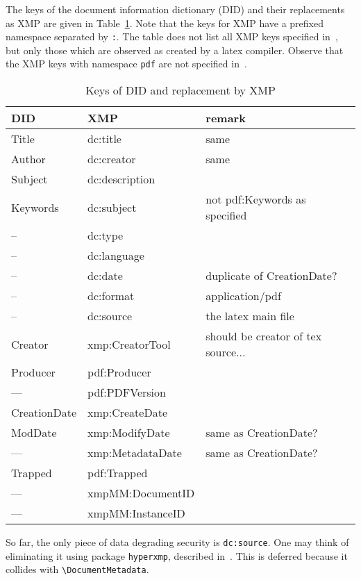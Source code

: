 \documentclass[a4paper, english]{article}%
\newcommand{\cmd}[1]{\texttt{\textbackslash#1}}
\begin{document}
The keys of the document information dictionary (DID) 
and their replacements as XMP are given in Table~\ref{tab:keysDID_XMP}. 
Note that the keys for XMP have a prefixed namespace separated by \texttt{:}. 
The table does not list all XMP keys specified in~\cite{ISO16684-1}, 
but only those which are observed as created by a latex compiler. 
Observe that the XMP keys with namespace \texttt{pdf} are not specified in~\cite{ISO16684-1}. 


\begin{longtable}{|lll|}
  \toprule
  DID & XMP & remark \\
  \midrule
  \midrule
  \endfirsthead%
  \bottomrule
  \caption{\label{tab:keysDID_XMP} Keys of DID and replacement by XMP}
  \endlastfoot%
  Title        & dc:title   & same\\
  Author       & dc:creator & same \\
  Subject      & dc:description & \\
  Keywords     & dc:subject & not pdf:Keywords as specified \\
  --           & dc:type & \\
  --           & dc:language & \\
  --           & dc:date & duplicate of CreationDate? \\
  --           & dc:format & application/pdf \\
  --           & dc:source & the latex main file \\
  Creator      & xmp:CreatorTool & should be creator of tex source... \\
  Producer     & pdf:Producer & \\
  ---          & pdf:PDFVersion & \\
  CreationDate & xmp:CreateDate & \\
  ModDate      & xmp:ModifyDate & same as CreationDate? \\
  ---          & xmp:MetadataDate & same as CreationDate? \\
  Trapped      & pdf:Trapped & \\
  ---          & xmpMM:DocumentID & \\
  ---          & xmpMM:InstanceID & \\
\end{longtable}

So far, the only piece of data degrading security 
is \texttt{dc:source}. 
One may think of eliminating it using package \texttt{hyperxmp}, 
described in~\cite{HyperXmpP}. 
This is deferred because it collides with \cmd{DocumentMetadata}. 
\end{document}
